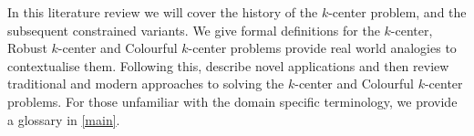 In this literature review we will cover the history of the $k$-center problem, and the subsequent constrained variants. We give formal definitions for the $k$-center, Robust $k$-center and Colourful $k$-center problems provide real world analogies to contextualise them. Following this, describe novel applications and then review traditional and modern approaches to solving the $k$-center and Colourful $k$-center problems. For those unfamiliar with the domain specific terminology, we provide a glossary in \cref{main}.